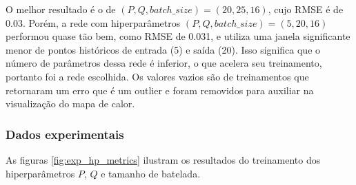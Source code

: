O melhor resultado é o de $(P,Q,batch\_size)=(20,25,16)$, cujo RMSE é de 0.03.  Porém, a rede com hiperparâmetros $(P,Q,batch\_size)=(5,20,16)$ performou quase tão bem, como RMSE de 0.031, e utiliza uma janela significante menor de pontos históricos de entrada (5) e saída (20). Isso significa que o número de parâmetros dessa rede é inferior, o que acelera seu treinamento, portanto foi a rede escolhida. Os valores vazios são de treinamentos que retornaram um erro que é um outlier e foram removidos para auxiliar na visualização do mapa de calor. 

\subsubsection{Dados experimentais}
As figuras \ref{fig:exp_hp_metrics} ilustram os resultados do treinamento dos hiperparâmetros $P$, $Q$ e tamanho de batelada.


